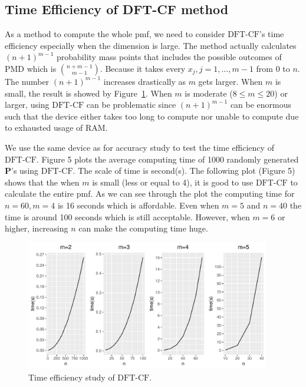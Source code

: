 \documentclass[12pt]{article}
\newcommand{\Pmat}{\mathbf{P}}
\newcommand{\PMD}{\textrm{PMD}}
\newcommand{\dft}{{\textrm{DFT-CF}}}
\begin{document}
\subsection{Time Efficiency of DFT-CF method}
As a method to compute the whole pmf, we need to consider $\dft$'s time efficiency especially when the dimension is large. The method actually calculates $(n+1)^{m-1}$ probability mass points that includes the possible outcomes of $\PMD$ which is $\binom{n+m-1}{m-1}$. Because it takes every $x_j,j=1,\dots,m-1$ from 0 to $n$. The number $(n+1)^{m-1}$ increases drastically as $m$ gets larger. When $m$ is small, the result is showed by Figure~\ref{fig:time.eff}. When $m$ is moderate ($8 \leq m \leq 20$) or larger, using $\dft$ can be problematic since $(n+1)^{m-1}$ can be enormous such that the device either takes too long to compute nor unable to compute due to exhausted usage of RAM.

We use the same device as for accuracy study to test the time efficiency of $\dft$. Figure 5 plots the average computing time of 1000 randomly generated $\Pmat$'s using $\dft$. The scale of time is second(s). The following plot (Figure 5) shows that the when $m$ is small (less or equal to 4), it is good to use $\dft$ to calculate the entire pmf. As we can see through the plot the computing time for $n=60, m=4$ is 16 seconds which is affordable. Even when $m=5$ and $n=40$ the time is around 100 seconds which is still acceptable. However, when $m=6$ or higher, increasing $n$ can make the computing time huge.


\begin{figure}%
\begin{center}
	\includegraphics[width=0.95\textwidth]{figures/effi.pdf}
	\caption{Time efficiency study of $\dft$.}
	\label{fig:time.eff}
\end{center}
\end{figure}
\end{document}
